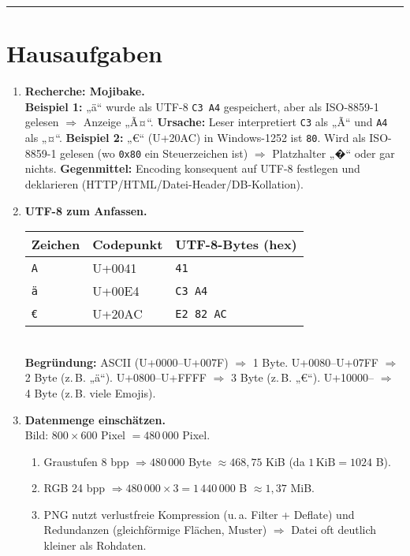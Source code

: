 \documentclass[11pt,a4paper]{scrartcl}
\begin{document}
	\hrule
	\vspace{0.6em}
	
	\section*{Hausaufgaben}
	
	\begin{enumerate}[leftmargin=*,label=\textbf{Aufgabe~\arabic*:}, itemsep=0.9em, start=1]
		
		\item \textbf{Recherche: Mojibake.}\\
		\textbf{Beispiel 1:} „ä“ wurde als UTF-8 \texttt{C3 A4} gespeichert, aber als ISO-8859-1 gelesen \(\Rightarrow\) Anzeige „Ã¤“.  
		\textbf{Ursache:} Leser interpretiert \texttt{C3} als „Ã“ und \texttt{A4} als „¤“.  
		\textbf{Beispiel 2:} „€“ (U+20AC) in Windows-1252 ist \texttt{80}. Wird als ISO-8859-1 gelesen (wo \texttt{0x80} ein Steuerzeichen ist) \(\Rightarrow\) Platzhalter „�“ oder gar nichts.  
		\textbf{Gegenmittel:} Encoding konsequent auf UTF-8 festlegen und deklarieren (HTTP/HTML/Datei-Header/DB-Kollation).
		
		\item \textbf{UTF-8 zum Anfassen.}\\
		\begin{tabular}{l l l}
			Zeichen & Codepunkt & UTF-8-Bytes (hex)\\\hline
			\texttt{A} & U+0041 & \texttt{41} \\
			\texttt{ä} & U+00E4 & \texttt{C3 A4} \\
			\texttt{€} & U+20AC & \texttt{E2 82 AC} \\
		\end{tabular}\\
		\textbf{Begründung:}  
		ASCII (U+0000–U+007F) \(\Rightarrow\) 1 Byte.  
		U+0080–U+07FF \(\Rightarrow\) 2 Byte (z.\,B. „ä“).  
		U+0800–U+FFFF \(\Rightarrow\) 3 Byte (z.\,B. „€“).  
		U+10000– \(\Rightarrow\) 4 Byte (z.\,B. viele Emojis).
		
		\item \textbf{Datenmenge einschätzen.}\\
		Bild: \(800\times600\) Pixel \(= 480\,000\) Pixel.
		\begin{enumerate}[label*=\alph*)]
			\item Graustufen 8 bpp \(\Rightarrow 480\,000\) Byte \(\approx 468{,}75\) KiB (da \(1\,\text{KiB}=1024\) B).  
			\item RGB 24 bpp \(\Rightarrow 480\,000\times 3 = 1\,440\,000\) B \(\approx 1{,}37\) MiB.  
			\item PNG nutzt verlustfreie Kompression (u.\,a. Filter + Deflate) und Redundanzen (gleichförmige Flächen, Muster) \(\Rightarrow\) Datei oft deutlich kleiner als Rohdaten.
		\end{enumerate}
		

\end{enumerate}
\end{document}
